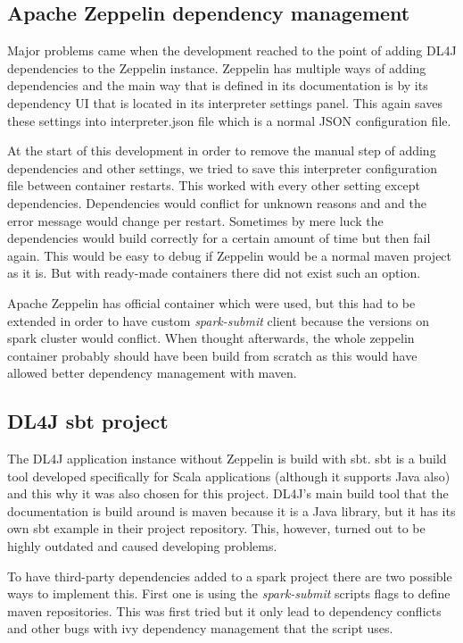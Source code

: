 \subsection{Apache Zeppelin dependency management}

Major problems came when the development reached to the point of adding DL4J dependencies to the Zeppelin instance.
Zeppelin has multiple ways of adding dependencies and the main way that is defined in its documentation is by its dependency UI that is located in its interpreter settings panel.
This again saves these settings into interpreter.json file which is a normal JSON configuration file.

At the start of this development in order to remove the manual step of adding dependencies and other settings, we tried to save this interpreter configuration file between container restarts.
This worked with every other setting except dependencies.
Dependencies would conflict for unknown reasons and and the error message would change per restart.
Sometimes by mere luck the dependencies would build correctly for a certain amount of time but then fail again.
This would be easy to debug if Zeppelin would be a normal maven project as it is.
But with ready-made containers there did not exist such an option.

Apache Zeppelin has official container which were used, but this had to be extended in order to have custom \emph{spark-submit} client because the versions on spark cluster would conflict.
When thought afterwards, the whole zeppelin container probably should have been build from scratch as this would have allowed better dependency management with maven.

\subsection{DL4J sbt project}

The DL4J application instance without Zeppelin is build with sbt.
sbt is a build tool developed specifically for Scala applications \cite{sbt} (although it supports Java also) and this why it was also chosen for this project.
DL4J's main build tool that the documentation is build around is maven because it is a Java library, but it has its own sbt example in their project repository.
This, however, turned out to be highly outdated and caused developing problems.

To have third-party dependencies added to a spark project there are two possible ways to implement this.
First one is using the \emph{spark-submit} scripts flags to define maven repositories.
This was first tried but it only lead to dependency conflicts and other bugs with ivy dependency management that the script uses.

